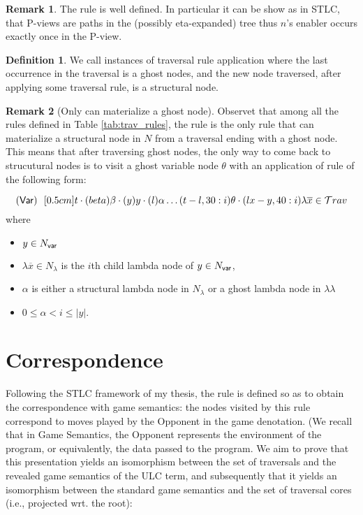 \documentclass{article}
\theoremstyle{definition}
\newtheorem{definition}{Definition}[section]
\newtheorem{remark}{Remark}[section]
\newcommand\Nodes{N}%
\newcommand\NodesVar{N_{\sf var}}%
\newcommand\NodesLmd{N_\lambda}%
\newcommand{\ghostlmd}{{\lambda\!\!\lambda}}
\newcommand{\ghostvar}{\theta}
\begin{document}
\begin{remark}
The rule  is well defined. In particular it can be show as in STLC, that P-views are paths in the (possibly eta-expanded) tree thus $n$'s enabler occurs exactly once in the P-view.
\end{remark}

\begin{definition}
We call  instances of traversal rule application where the last occurrence in the traversal is
a ghost nodes, and the new node traversed, after applying some traversal rule, is a structural node.
\end{definition}

\begin{remark}[Only  can materialize a ghost node]
Observet that among all the rules defined in Table \ref{tab:trav_rules}, the rule  is the only rule that can materialize a structural node in $\Nodes$ from a traversal ending with a ghost node. This means that after traversing ghost nodes, the only way to come back to strucutural nodes is to visit a ghost variable node $\ghostvar$ with an application of rule  of the following form:

$$\rulename{Var}\ \  \Pstr[0.5cm]{ t \cdot(beta){\beta} \cdot
(y){y} \cdot (l){\alpha}  \ldots (t-l,30:i){\ghostvar}
    \cdot (lx-y,40:i){\lambda \overline{x}}
     \in\travset}$$
where
\begin{itemize}
\item $y \in \NodesVar$
\item $\lambda \overline{x} \in \NodesLmd$ is the $i$th child lambda node of $y \in \NodesVar$,
\item $\alpha$ is either a structural lambda node in $\Nodes_\lambda$ or a ghost lambda node in $\ghostlmd$
\item $0\leq \alpha < i \leq |y|$.
\end{itemize}
\end{remark}




\section{Correspondence}
Following the STLC framework of my thesis, the rule  is defined so as to obtain the correspondence with game semantics: the nodes visited by this rule correspond to moves played by the Opponent in the game denotation. (We recall that in Game Semantics, the Opponent represents the environment of the program, or equivalently, the data passed to the program.
We aim to prove that this presentation yields an isomorphism between the set of traversals and the revealed game semantics of the ULC term, and subsequently that it yields an isomorphism between the standard game semantics and the set of traversal cores (i.e., projected wrt. the root):
\end{document}
